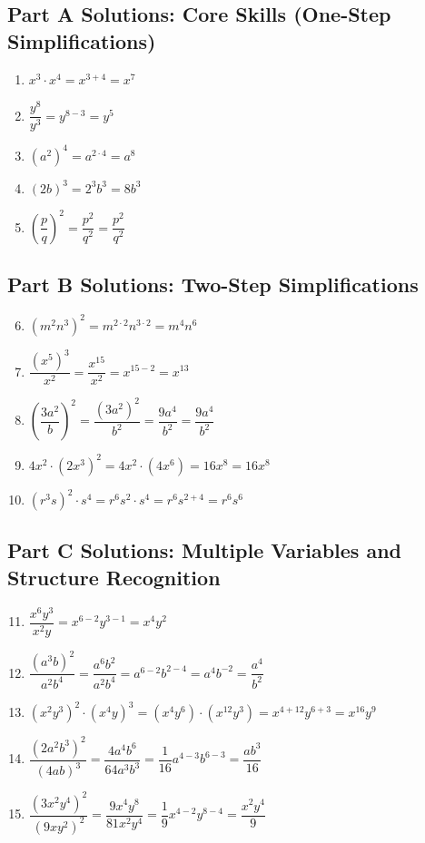 \documentclass[14pt]{extarticle}
\begin{document}
\subsection*{Part A Solutions: Core Skills (One-Step Simplifications)}
\begin{enumerate}
  \item \(x^3 \cdot x^4 = x^{3+4} = \boxed{x^7}\)
  \item \(\dfrac{y^8}{y^3} = y^{8-3} = \boxed{y^5}\)
  \item \((a^2)^4 = a^{2 \cdot 4} = \boxed{a^8}\)
  \item \((2b)^3 = 2^3 b^3 = \boxed{8b^3}\)
  \item \(\left(\dfrac{p}{q}\right)^2 = \dfrac{p^2}{q^2} = \boxed{\dfrac{p^2}{q^2}}\)
\end{enumerate}

\subsection*{Part B Solutions: Two-Step Simplifications}
\begin{enumerate}
  \setcounter{enumi}{5}
  \item \((m^2 n^3)^2 = m^{2 \cdot 2} n^{3 \cdot 2} = \boxed{m^4 n^6}\)
  \item \(\dfrac{(x^5)^3}{x^2} = \dfrac{x^{15}}{x^2} = x^{15-2} = \boxed{x^{13}}\)
  \item \(\left(\dfrac{3a^2}{b}\right)^2 = \dfrac{(3a^2)^2}{b^2} = \dfrac{9a^4}{b^2} = \boxed{\dfrac{9a^4}{b^2}}\)
  \item \(4x^2 \cdot (2x^3)^2 = 4x^2 \cdot (4x^6) = 16x^8 = \boxed{16x^8}\)
  \item \((r^3 s)^2 \cdot s^4 = r^{6} s^{2} \cdot s^4 = r^6 s^{2+4} = \boxed{r^6 s^6}\)
\end{enumerate}

\subsection*{Part C Solutions: Multiple Variables and Structure Recognition}
\begin{enumerate}
  \setcounter{enumi}{10}
  \item \(\dfrac{x^6 y^3}{x^2 y} = x^{6-2} y^{3-1} = \boxed{x^4 y^2}\)
  \item \(\dfrac{(a^3 b)^2}{a^2 b^4} = \dfrac{a^6 b^2}{a^2 b^4} = a^{6-2} b^{2-4} = a^4 b^{-2} = \boxed{\dfrac{a^4}{b^2}}\)
  \item \((x^2 y^3)^2 \cdot (x^4 y)^3 = (x^4 y^6) \cdot (x^{12} y^3) = x^{4+12} y^{6+3} = \boxed{x^{16} y^9}\)
  \item \(\dfrac{(2a^2 b^3)^2}{(4ab)^3} = \dfrac{4a^4 b^6}{64a^3 b^3} = \dfrac{1}{16} a^{4-3} b^{6-3} = \boxed{\dfrac{ab^3}{16}}\)
  \item \(\dfrac{(3x^2 y^4)^2}{(9xy^2)^2} = \dfrac{9x^4 y^8}{81x^2 y^4} = \dfrac{1}{9} x^{4-2} y^{8-4} = \boxed{\dfrac{x^2 y^4}{9}}\)
\end{enumerate}
\end{document}
